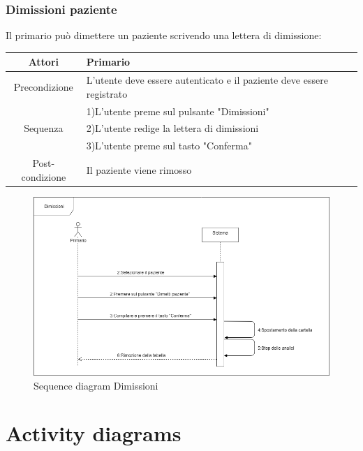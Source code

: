 \documentclass[a4paper]{report}
\begin{document}
            \subsubsection{Dimissioni paziente}
                Il primario può dimettere un paziente scrivendo una lettera di dimissione:
               \begin{table}[htbp]
                    \begin{tabular}{|c|l|}
                        \hline
                        Attori & Primario \\\hline
                    Precondizione & L'utente deve essere autenticato e il paziente deve essere registrato \\\hline
                     & 1)L'utente preme sul pulsante "Dimissioni" \\
                    Sequenza & 2)L'utente redige la lettera di dimissioni \\
                      & 3)L'utente preme sul tasto "Conferma" \\\hline
                    Post-condizione & Il paziente viene rimosso   \\\hline
                    \end{tabular}
                \end{table}
                \begin{figure}[htbp]
                    \centering
                     \includegraphics[scale=0.4]{Dimissioni.png}
                        \caption{Sequence diagram Dimissioni}
                \end{figure}
    \section{Activity diagrams}
\end{document}
